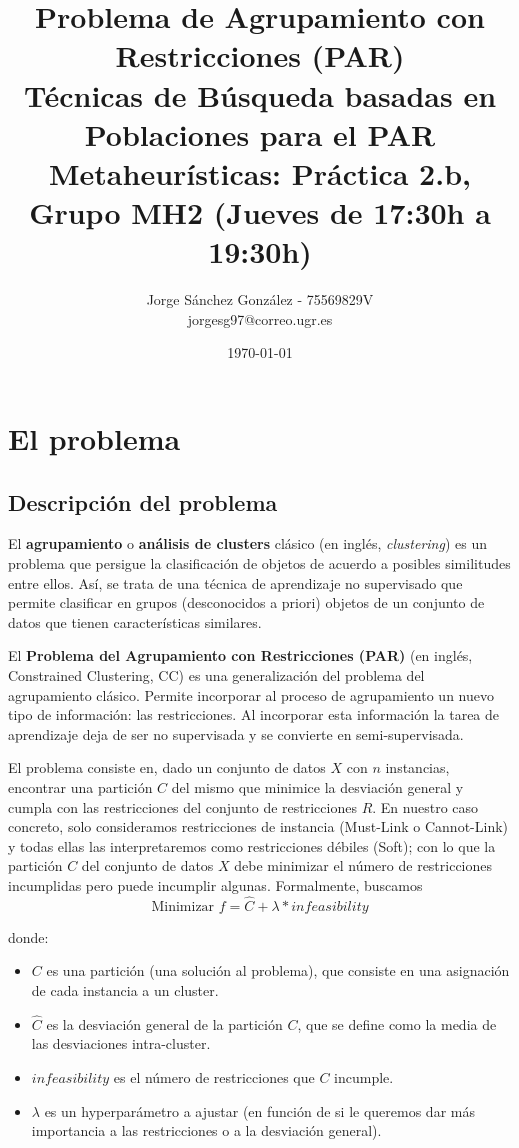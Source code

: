 \documentclass[11pt,a4paper]{article}
\title{Problema de Agrupamiento con Restricciones (PAR)
	\\\medskip \large Técnicas de Búsqueda basadas en Poblaciones para el PAR \\\medskip
	\large Metaheurísticas: Práctica 2.b, Grupo MH2 (Jueves de 17:30h a 19:30h)}
\author{Jorge Sánchez González - 75569829V \\ jorgesg97@correo.ugr.es}
\date{ \today }
\begin{document}
	
	
	\maketitle 
	\newpage
	\tableofcontents
	\newpage
	
	
	\section{El problema}
	
	\subsection{Descripción del problema}\label{sec:problema}
	El \textbf{agrupamiento} o \textbf{análisis de clusters} clásico (en inglés, \emph{clustering}) es un problema que persigue la clasificación de objetos de acuerdo a posibles similitudes entre ellos. Así, se trata de una técnica de aprendizaje no supervisado que permite clasificar en grupos (desconocidos a priori) objetos de un conjunto de datos que tienen características similares.
	
    El \textbf{Problema del Agrupamiento con Restricciones (PAR)} (en
    inglés, Constrained Clustering, CC) es una
    generalización del problema del agrupamiento clásico.
    Permite incorporar al proceso de agrupamiento un nuevo tipo
    de información: las restricciones. Al incorporar esta información la tarea de aprendizaje deja de ser no supervisada y se convierte en semi-supervisada. 
    
    El problema consiste en, dado un conjunto de datos $X$ con $n$ instancias, encontrar una partición $C$ del mismo que minimice la desviación general y cumpla con las restricciones del conjunto de restricciones $R$. En nuestro caso concreto, solo consideramos restricciones de instancia (Must-Link o Cannot-Link) y todas ellas las interpretaremos como restricciones débiles (Soft); con lo que la partición $C$ del conjunto de datos $X$ debe minimizar el número de restricciones incumplidas pero puede incumplir algunas. Formalmente, buscamos
    $$ \text{Minimizar } f = \hat{C} + \lambda * infeasibility$$
	
	donde:
	\begin{itemize}
		\item $C$ es una partición (una solución al problema), que consiste en una asignación de cada instancia a un cluster.
		\item $\hat{C}$ es la desviación general de la partición $C$, que se define como la media de las desviaciones intra-cluster.
		\item $infeasibility$ es el número de restricciones que $C$ incumple.
		\item $\lambda$ es un hyperparámetro a ajustar (en función de si le queremos dar más importancia a las restricciones o a la desviación general).
		
	\end{itemize}
\end{document}

